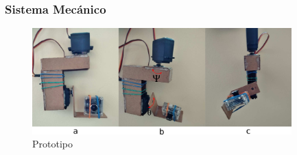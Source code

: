 \documentclass[11pt]{beamer}
\begin{document}
  \begin{frame}
    \frametitle{Sistema Mecánico}
    \begin{figure}
      \includegraphics[width=10cm, keepaspectratio]{images/prototipo.png}
      \caption{Prototipo}
    \end{figure}
  \end{frame}


\end{document}
